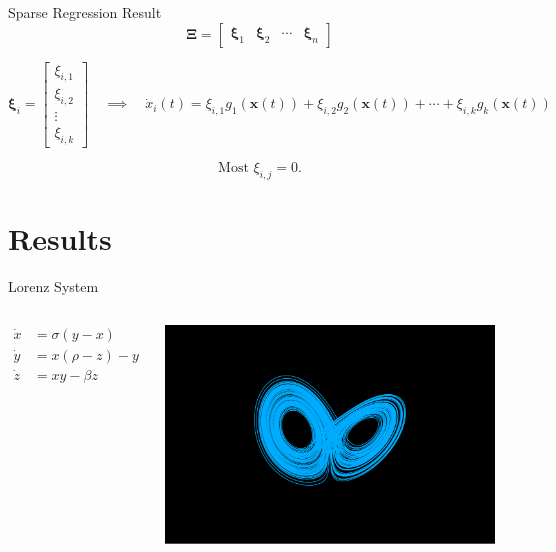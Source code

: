 \documentclass[aspectratio=169]{beamer}
\begin{document}
\begin{frame}{Sparse Regression Result}
	\[ \mathbf \Xi = \begin{bmatrix}
		\mathbf \xi_1 & \mathbf \xi_2 & \cdots & \mathbf \xi_n
	\end{bmatrix} \]

	\[ \mathbf \xi_i = \begin{bmatrix}
		\xi_{i, 1} \\ \xi_{i, 2} \\ \vdots \\ \xi_{i, k}
	\end{bmatrix} \quad \implies \quad \dot x_i(t) = \xi_{i, 1}g_1(\mathbf x(t)) + \xi_{i, 2}g_2(\mathbf x(t)) + \cdots + \xi_{i, k}g_k(\mathbf x(t)) \]

	\[ \text{Most } \xi_{i, j} = 0. \]
\end{frame}

\section{Results}

\begin{frame}{Lorenz System}
	\begin{columns}
		\[\begin{split}
			\dot x &= \sigma(y - x) \\
			\dot y &= x(\rho - z) - y \\
			\dot z &= xy - \beta z
		\end{split} \]
		\begin{center}
			\includegraphics[width=0.95\textwidth, trim={4cm, 1.5cm, 4cm, 3cm}, clip]{Examples/slide3_lorenz_attractor.pdf}
		\end{center}
	\end{columns}
\end{frame}
\end{document}

